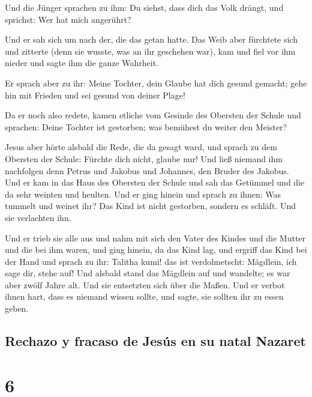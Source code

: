  Und die Jünger sprachen zu ihm: Du siehst, dass dich das
Volk drängt, und sprichst: Wer hat mich angerührt?

 Und er sah sich um nach der, die das getan hatte.
 Das Weib aber fürchtete sich und zitterte (denn sie
wusste, was an ihr geschehen war), kam und fiel vor ihm nieder und sagte
ihm die ganze Wahrheit.

 Er sprach aber zu ihr: Meine Tochter, dein Glaube hat
dich gesund gemacht; gehe hin mit Frieden und sei gesund von deiner
Plage!

 Da er noch also redete, kamen etliche vom Gesinde des
Obersten der Schule und sprachen: Deine Tochter ist gestorben; was
bemühest du weiter den Meister?

 Jesus aber hörte alsbald die Rede, die da gesagt ward,
und sprach zu dem Obersten der Schule: Fürchte dich nicht, glaube nur!
 Und ließ niemand ihm nachfolgen denn Petrus und Jakobus
und Johannes, den Bruder des Jakobus.  Und er kam in das
Haus des Obersten der Schule und sah das Getümmel und die da sehr
weinten und heulten.  Und er ging hinein und sprach zu
ihnen: Was tummelt und weinet ihr? Das Kind ist nicht gestorben, sondern
es schläft. Und sie verlachten ihn.

 Und er trieb sie alle aus und nahm mit sich den Vater
des Kindes und die Mutter und die bei ihm waren, und ging hinein, da das
Kind lag,  und ergriff das Kind bei der Hand und sprach
zu ihr: Talitha kumi! das ist verdolmetscht: Mägdlein, ich sage dir,
stehe auf!  Und alsbald stand das Mägdlein auf und
wandelte; es war aber zwölf Jahre alt. Und sie entsetzten sich über die
Maßen.  Und er verbot ihnen hart, dass es niemand wissen
sollte, und sagte, sie sollten ihr zu essen geben.

\hypertarget{rechazo-y-fracaso-de-jesuxfas-en-su-natal-nazaret}{%
\subsection{Rechazo y fracaso de Jesús en su natal
Nazaret}\label{rechazo-y-fracaso-de-jesuxfas-en-su-natal-nazaret}}

\hypertarget{section-5}{%
\section{6}\label{section-5}}

